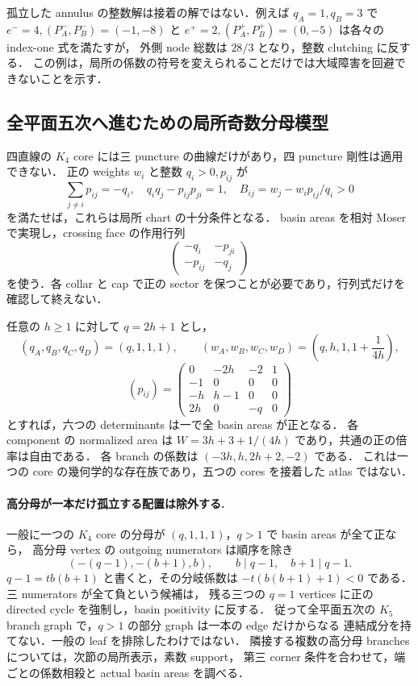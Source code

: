 孤立した annulus の整数解は接着の解ではない．例えば $q_A=1,q_B=3$ で
$e^-=4,(P_A^-,P_B^-)=(-1,-8)$ と
$e^+=2,(P_A^+,P_B^+)=(0,-5)$ は各々の index-one 式を満たすが，
外側 node 総数は $28/3$ となり，整数 clutching に反する．
この例は，局所の係数の符号を変えられることだけでは大域障害を回避できないことを示す．

\subsection{全平面五次へ進むための局所奇数分母模型}

四直線の $K_4$ core には三 puncture の曲線だけがあり，四 puncture 剛性は適用できない．
正の weights $w_i$ と整数 $q_i>0,p_{ij}$ が
\[
 \sum_{j\ne i}p_{ij}=-q_i,\quad q_iq_j-p_{ij}p_{ji}=1,
 \quad B_{ij}=w_j-w_i p_{ij}/q_i>0
\]
を満たせば，これらは局所 chart の十分条件となる．
basin areas を相対 Moser で実現し，crossing face の作用行列
\[
 \begin{pmatrix}-q_i&-p_{ji}\\-p_{ij}&-q_j\end{pmatrix}
\]
を使う．各 collar と cap で正の sector を保つことが必要であり，行列式だけを確認して終えない．

任意の $h\ge1$ に対して $q=2h+1$ とし，
\[
 (q_A,q_B,q_C,q_D)=(q,1,1,1),\qquad
 (w_A,w_B,w_C,w_D)=\left(q,h,1,1+\frac1{4h}\right),
\]
\[
 (p_{ij})=
 \begin{pmatrix}
 0&-2h&-2&1\\
 -1&0&0&0\\
 -h&h-1&0&0\\
 2h&0&-q&0
 \end{pmatrix}
\]
とすれば，六つの determinants は一で全 basin areas が正となる．
各 component の normalized area は $W=3h+3+1/(4h)$ であり，共通の正の倍率は自由である．
各 branch の係数は $(-3h,h,2h+2,-2)$ である．
これは一つの core の幾何学的な存在族であり，五つの cores を接着した atlas ではない．

\paragraph{高分母が一本だけ孤立する配置は除外する.}
一般に一つの $K_4$ core の分母が $(q,1,1,1)$，$q>1$ で basin areas が全て正なら，
高分母 vertex の outgoing numerators は順序を除き
\[
 (-(q-1),-(b+1),b),\qquad b\mid q-1,\quad b+1\mid q-1.
\]
$q-1=t b(b+1)$ と書くと，その分岐係数は
$-t(b(b+1)+1)<0$ である．三 numerators が全て負という候補は，
残る三つの $q=1$ vertices に正の directed cycle を強制し，basin positivity に反する．
従って全平面五次の $K_5$ branch graph で，$q>1$ の部分 graph は一本の edge だけからなる
連結成分を持てない．一般の leaf を排除したわけではない．
隣接する複数の高分母 branches については，次節の局所表示，素数 support，
第三 corner 条件を合わせて，端ごとの係数相殺と actual basin areas を調べる．
